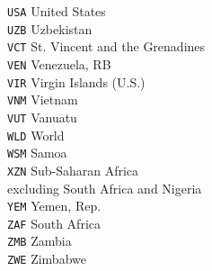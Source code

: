 \begin{multicols}{3}
{\texttt{USA}	United States\\
\texttt{UZB}	Uzbekistan\\
\texttt{VCT}	St. Vincent and the Grenadines\\
\texttt{VEN}	Venezuela, RB\\
\texttt{VIR}	Virgin Islands (U.S.)\\
\texttt{VNM}	Vietnam\\
\texttt{VUT}	Vanuatu\\
\texttt{WLD}	World\\
\texttt{WSM}	Samoa\\
\texttt{XZN}	Sub-Saharan Africa \\
excluding South Africa and Nigeria\\
\texttt{YEM}	Yemen, Rep.\\
\texttt{ZAF}	South Africa\\
\texttt{ZMB}	Zambia\\
\texttt{ZWE}	Zimbabwe
}
\end{multicols}
